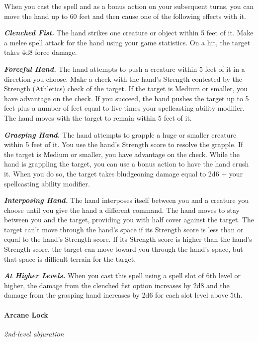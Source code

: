 \documentclass[
]{article}
\begin{document}
When you cast the spell and as a bonus action on your subsequent turns,
you can move the hand up to 60 feet and then cause one of the following
effects with it.

\emph{\textbf{Clenched Fist.}} The hand strikes one creature or object
within 5 feet of it. Make a melee spell attack for the hand using your
game statistics. On a hit, the target takes 4d8 force damage.

\emph{\textbf{Forceful Hand.}} The hand attempts to push a creature
within 5 feet of it in a direction you choose. Make a check with the
hand's Strength contested by the Strength (Athletics) check of the
target. If the target is Medium or smaller, you have advantage on the
check. If you succeed, the hand pushes the target up to 5 feet plus a
number of feet equal to five times your spellcasting ability modifier.
The hand moves with the target to remain within 5 feet of it.

\emph{\textbf{Grasping Hand.}} The hand attempts to grapple a huge or
smaller creature within 5 feet of it. You use the hand's Strength score
to resolve the grapple. If the target is Medium or smaller, you have
advantage on the check. While the hand is grappling the target, you can
use a bonus action to have the hand crush it. When you do so, the target
takes bludgeoning damage equal to 2d6 + your spellcasting ability
modifier.

\emph{\textbf{Interposing Hand.}} The hand interposes itself between you
and a creature you choose until you give the hand a different command.
The hand moves to stay between you and the target, providing you with
half cover against the target. The target can't move through the hand's
space if its Strength score is less than or equal to the hand's Strength
score. If its Strength score is higher than the hand's Strength score,
the target can move toward you through the hand's space, but that space
is difficult terrain for the target.

\emph{\textbf{At Higher Levels.}} When you cast this spell using a spell
slot of 6th level or higher, the damage from the clenched fist option
increases by 2d8 and the damage from the grasping hand increases by 2d6
for each slot level above 5th.

\hypertarget{arcane-lock}{%
\paragraph{Arcane Lock}\label{arcane-lock}}

\emph{2nd-level abjuration}
\end{document}

